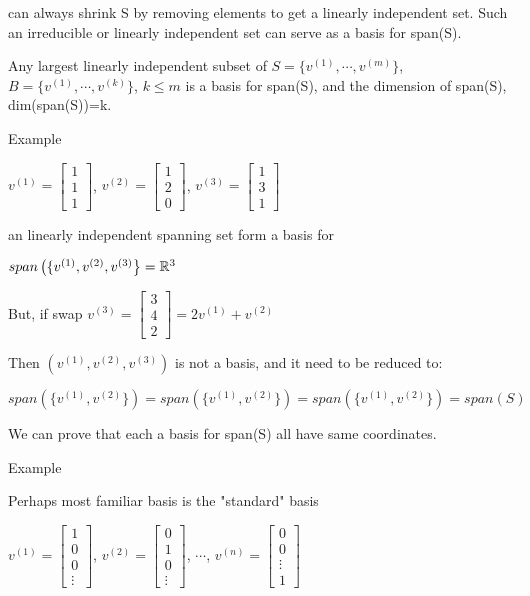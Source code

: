 can always shrink S by removing elements to get a linearly independent set. Such an irreducible or linearly independent set can serve as a basis for span(S).

Any largest linearly independent subset of $S=\{v^{(1)},\cdots , v^{(m)}\}$,$B=\{v^{(1)},\cdots , v^{(k)}\}$, $k\leq m$ is a basis for span(S), and the dimension of span(S), dim(span(S))=k.


Example

$v^{(1)}= 
\left[ 
\begin{array}{c} 
1 \\
1 \\
1
\end{array}
\right]$,
$v^{(2)}= 
\left[ 
\begin{array}{c} 
1 \\
2 \\
0
\end{array}
\right]$,
$v^{(3)}= 
\left[ 
\begin{array}{c} 
1 \\
3 \\
1
\end{array}
\right]$

an linearly independent spanning set form a basis for

$span\left(\{v^{(1)},v^{(2)}, v^{(3)}\right\}=\mathbb{R}^{3}$

But, if swap $v^{(3)}= 
\left[ 
\begin{array}{c} 
3 \\
4 \\
2
\end{array}
\right]
=2v^{(1)}+v^{(2)}$

Then $\left(v^{(1)},v^{(2)}, v^{(3)}\right)$ is not a basis, and it need to be reduced to:

$span\left(\{v^{(1)},v^{(2)}\}\right)=span\left(\{v^{(1)},v^{(2)}\}\right)=span\left(\{v^{(1)},v^{(2)}\}\right)=span(S)$

We can prove that each a basis for span(S) all have same coordinates.

Example

Perhaps most familiar basis is the "standard" basis

$v^{(1)}= 
\left[ 
\begin{array}{c} 
1 \\
0 \\
0 \\
\vdots
\end{array}
\right]$,
$v^{(2)}= 
\left[ 
\begin{array}{c} 
0 \\
1 \\
0 \\
\vdots
\end{array}
\right]$, $\cdots$,
$v^{(n)}= 
\left[ 
\begin{array}{c} 
0 \\
0 \\
\vdots \\
1 
\end{array}
\right]$


